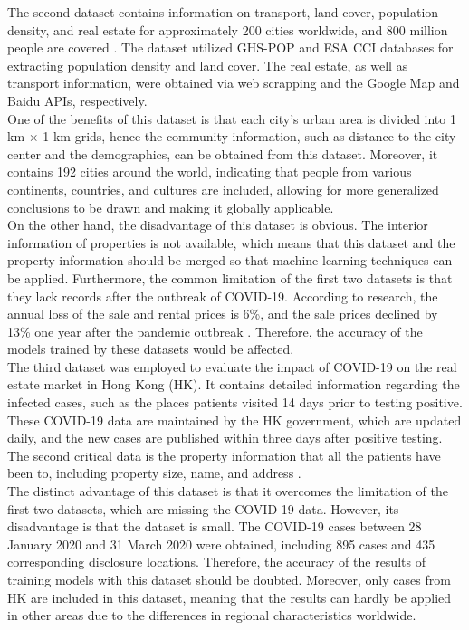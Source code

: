 \documentclass[12pt,twoside]{report}
\begin{document}
The second dataset contains information on transport, land cover, population density, and real estate for approximately 200 cities worldwide, and 800 million people are covered \citep{RN26}. The dataset utilized GHS-POP and ESA CCI databases for extracting population density and land cover. The real estate, as well as transport information, were obtained via web scrapping and the Google Map and Baidu APIs, respectively.
\\ 

One of the benefits of this dataset is that each city's urban area is divided into 1 km $\times$ 1 km grids, hence the community information, such as distance to the city center and the demographics, can be obtained from this dataset. Moreover, it contains 192 cities around the world, indicating that people from various continents, countries, and cultures are included, allowing for more generalized conclusions to be drawn and making it globally applicable. 
\\

On the other hand, the disadvantage of this dataset is obvious. The interior information of properties is not available, which means that this dataset and the property information should be merged so that machine learning techniques can be applied. Furthermore, the common limitation of the first two datasets is that they lack records after the outbreak of COVID-19. According to research, the annual loss of the sale and rental prices is 6\%, and the sale prices declined by 13\% one year after the pandemic outbreak \citep{RN29}. Therefore, the accuracy of the models trained by these datasets would be affected. 
\\

The third dataset was employed to evaluate the impact of COVID-19 on the real estate market in Hong Kong (HK). It contains detailed information regarding the infected cases, such as the places patients visited 14 days prior to testing positive. These COVID-19 data are maintained by the HK government, which are updated daily, and the new cases are published within three days after positive testing. The second critical data is the property information that all the patients have been to, including property size, name, and address \citep{RN24}.
\\ 

The distinct advantage of this dataset is that it overcomes the limitation of the first two datasets, which are missing the COVID-19 data. However, its disadvantage is that the dataset is small. The COVID-19 cases between 28 January 2020 and 31 March 2020 were obtained, including 895 cases and 435 corresponding disclosure locations. Therefore, the accuracy of the results of training models with this dataset should be doubted. Moreover, only cases from HK are included in this dataset, meaning that the results can hardly be applied in other areas due to the differences in regional characteristics worldwide. 
\end{document}
